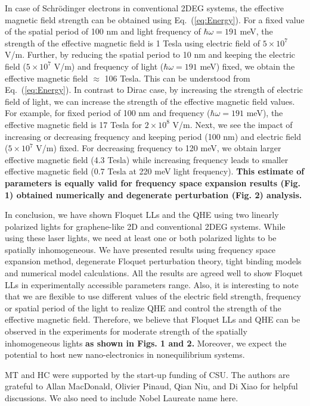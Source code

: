 In case of Schr\"{o}dinger electrons in conventional 2DEG systems, the effective magnetic field strength can be obtained using Eq.~(\ref{eq:Energy}). For a fixed value of the spatial period of 100 nm and light frequency of $\hbar \omega = 191$ meV, the strength of the effective magnetic field is 1 Tesla using electric field of $5 \times 10^7$ V/m. Further, by reducing the spatial period to 10 nm and keeping the electric field ($5 \times 10^7$ V/m) and frequency of light ($\hbar \omega = 191 $ meV) fixed, we obtain the effective magnetic field $\approx$ 106 Tesla. This can be understood from Eq.~(\ref{eq:Energy}). In contrast to Dirac case, by increasing the strength of electric field of light, we can increase the strength of the effective magnetic field values. For example, for fixed period of 100 nm and frequency ($\hbar \omega = 191 $ meV), the effective magnetic field is 17 Tesla for $2 \times 10^8$ V/m. Next, we see the impact of increasing or decreasing frequency and keeping period (100 nm) and electric field ($5 \times 10^7$ V/m) fixed. For decreasing frequency to 120 meV, we obtain larger effective magnetic field (4.3 Tesla) while increasing frequency leads to smaller effective magnetic field (0.7 Tesla at 220 meV light frequency). \textbf{This estimate of parameters is equally valid for frequency space expansion results (Fig. 1) obtained numerically and degenerate perturbation (Fig. 2) analysis.}

In conclusion, we have shown Floquet LLs and the QHE using two linearly polarized lights for graphene-like 2D and conventional 2DEG systems. While using these laser lights, we  need at least one or both polarized lights to be spatially inhomogeneous. We have presented results using frequency space expansion method, degenerate Floquet perturbation theory, tight binding models and numerical model calculations. All the results are agreed well to show Floquet LLs in experimentally accessible parameters range. Also, it is interesting to note that we are flexible to use different values of the electric field strength, frequency or spatial period of the light to realize QHE and control the strength of the effective magnetic field. Therefore, we believe that Floquet LLs and QHE can be observed in the experiments for moderate strength of the spatially inhomogeneous lights \textbf{as shown in Figs. 1 and 2.} Moreover, we expect the potential to host new nano-electronics in nonequilibrium systems.

\begin{acknowledgments}
MT and HC were supported by the start-up funding of CSU. The authors are grateful to Allan MacDonald, Olivier Pinaud, Qian Niu, and Di Xiao for helpful discussions. We also need to include Nobel Laureate name here.
\end{acknowledgments}



